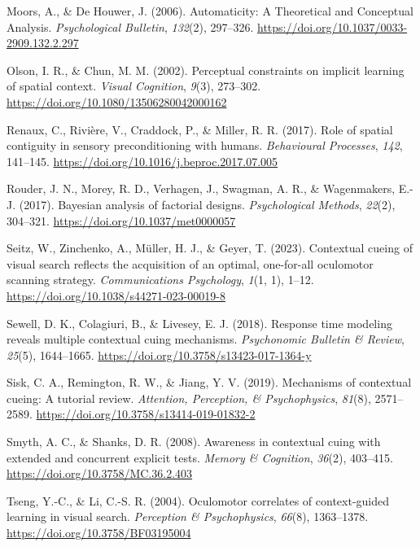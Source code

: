 \documentclass[
  man,
  floatsintext,
  longtable,
  nolmodern,
  notxfonts,
  notimes,
  colorlinks=true,linkcolor=blue,citecolor=blue,urlcolor=blue]{apa7}
\newlength{\cslhangindent}
\newenvironment{CSLReferences}[2] %
 {\begin{list}{}{%
  \setlength{\itemindent}{0pt}
  \setlength{\leftmargin}{0pt}
  \setlength{\parsep}{0pt}
  \ifodd #1
   \setlength{\leftmargin}{\cslhangindent}
   \setlength{\itemindent}{-1\cslhangindent}
  \fi
  \setlength{\itemsep}{#2\baselineskip}}}
 {\end{list}}
\begin{document}
\begin{CSLReferences}{1}{0}
Moors, A., \& De Houwer, J. (2006). Automaticity: {A Theoretical} and
{Conceptual Analysis}. \emph{Psychological Bulletin}, \emph{132}(2),
297--326. \url{https://doi.org/10.1037/0033-2909.132.2.297}

Olson, I. R., \& Chun, M. M. (2002). Perceptual constraints on implicit
learning of spatial context. \emph{Visual Cognition}, \emph{9}(3),
273--302. \url{https://doi.org/10.1080/13506280042000162}

Renaux, C., Rivière, V., Craddock, P., \& Miller, R. R. (2017). Role of
spatial contiguity in sensory preconditioning with humans.
\emph{Behavioural Processes}, \emph{142}, 141--145.
\url{https://doi.org/10.1016/j.beproc.2017.07.005}

Rouder, J. N., Morey, R. D., Verhagen, J., Swagman, A. R., \&
Wagenmakers, E.-J. (2017). Bayesian analysis of factorial designs.
\emph{Psychological Methods}, \emph{22}(2), 304--321.
\url{https://doi.org/10.1037/met0000057}

Seitz, W., Zinchenko, A., Müller, H. J., \& Geyer, T. (2023). Contextual
cueing of visual search reflects the acquisition of an optimal,
one-for-all oculomotor scanning strategy. \emph{Communications
Psychology}, \emph{1}(1, 1), 1--12.
\url{https://doi.org/10.1038/s44271-023-00019-8}

Sewell, D. K., Colagiuri, B., \& Livesey, E. J. (2018). Response time
modeling reveals multiple contextual cuing mechanisms. \emph{Psychonomic
Bulletin \& Review}, \emph{25}(5), 1644--1665.
\url{https://doi.org/10.3758/s13423-017-1364-y}

Sisk, C. A., Remington, R. W., \& Jiang, Y. V. (2019). Mechanisms of
contextual cueing: {A} tutorial review. \emph{Attention, Perception, \&
Psychophysics}, \emph{81}(8), 2571--2589.
\url{https://doi.org/10.3758/s13414-019-01832-2}

Smyth, A. C., \& Shanks, D. R. (2008). Awareness in contextual cuing
with extended and concurrent explicit tests. \emph{Memory \& Cognition},
\emph{36}(2), 403--415. \url{https://doi.org/10.3758/MC.36.2.403}

Tseng, Y.-C., \& Li, C.-S. R. (2004). Oculomotor correlates of
context-guided learning in visual search. \emph{Perception \&
Psychophysics}, \emph{66}(8), 1363--1378.
\url{https://doi.org/10.3758/BF03195004}


\end{CSLReferences}
\end{document}
